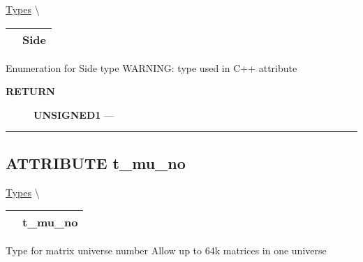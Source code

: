 \hypertarget{ecldoc:ecldoc-Side}{}
\hspace{0pt} \hyperlink{ecldoc:PBblas.Types}{Types} \textbackslash 

{\renewcommand{\arraystretch}{1.5}
\begin{tabularx}{\textwidth}{|>{\raggedright\arraybackslash}l|X|}
\hline
\hspace{0pt}\mytexttt{\color{red} } & \textbf{Side} \\
\hline
\end{tabularx}
}

\par





Enumeration for Side type WARNING: type used in C++ attribute








\par
\begin{description}
\item [\colorbox{tagtype}{\color{white} \textbf{\textsf{RETURN}}}] \textbf{UNSIGNED1} --- 
\end{description}




\rule{\linewidth}{0.5pt}
\subsection*{\textsf{\colorbox{headtoc}{\color{white} ATTRIBUTE}
t\_mu\_no}}

\hypertarget{ecldoc:pbblas.types.t_mu_no}{}
\hspace{0pt} \hyperlink{ecldoc:PBblas.Types}{Types} \textbackslash 

{\renewcommand{\arraystretch}{1.5}
\begin{tabularx}{\textwidth}{|>{\raggedright\arraybackslash}l|X|}
\hline
\hspace{0pt}\mytexttt{\color{red} } & \textbf{t\_mu\_no} \\
\hline
\end{tabularx}
}

\par





Type for matrix universe number Allow up to 64k matrices in one universe








